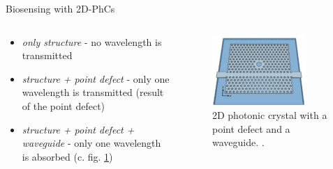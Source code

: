 \begin{frame}{Biosensing with 2D-PhCs}

  \begin{columns}

    \begin{column}{0.49\textwidth}
    \begin{itemize}
      \setlength\itemsep{1.2em}
      \item{\emph{only structure} - no wavelength is transmitted }
      \item{\emph{structure + point defect} - only one wavelength is transmitted (result of the point defect)}
      \item{\emph{structure + point defect + waveguide} - only one wavelength is absorbed (c. fig. \ref{fig: 2d_photonic_crystal})}
    \end{itemize}
    \end{column}

    \begin{column}{0.49\textwidth}
    \begin{figure}
      \centering
      \includegraphics[width=0.8\textwidth]{./bilder/2dphc_waveguide_point_defect.png}
      \caption{2D photonic crystal with a point defect and a waveguide. \cite{nano}.}
      \label{fig: 2d_photonic_crystal}
    \end{figure}
  \end{column}

  \end{columns}

\end{frame}



